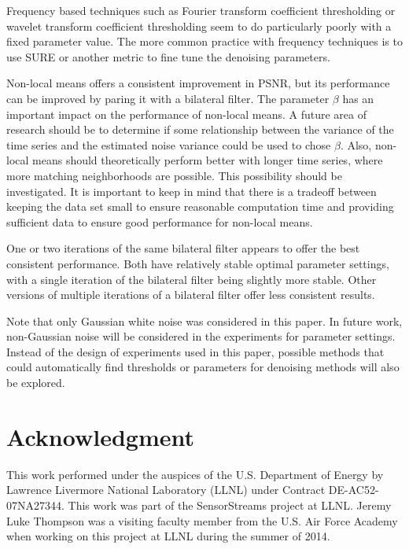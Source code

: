 \documentclass[11pt]{article}
\theoremstyle{definition}
\begin{document}
Frequency based techniques such as Fourier transform coefficient
thresholding or wavelet transform coefficient thresholding seem to do
particularly poorly with a fixed parameter value. The more common
practice with frequency techniques is to use SURE or another metric to
fine tune the denoising parameters.

Non-local means offers a consistent improvement in PSNR, but its
performance can be improved by paring it with a bilateral filter. The
parameter $\beta$ has an important impact on the performance of
non-local means. A future area of research should be to determine if
some relationship between the variance of the time series and the
estimated noise variance could be used to chose $\beta$. Also,
non-local means should theoretically perform better with longer time
series, where more matching neighborhoods are possible. This
possibility should be investigated. It is important to keep in mind
that there is a tradeoff between keeping the data set small to ensure
reasonable computation time and providing sufficient data to ensure
good performance for non-local means.

One or two iterations of the same bilateral filter appears to offer
the best consistent performance. Both have relatively stable optimal
parameter settings, with a single iteration of the bilateral filter
being slightly more stable. Other versions of multiple iterations of a
bilateral filter offer less consistent results.

Note that only Gaussian white noise was considered in this paper. In future work, non-Gaussian noise will be considered in the experiments for parameter settings. Instead of the design of experiments used in this paper, possible methods that could automatically find thresholds or parameters for denoising methods will also be explored.


\section*{Acknowledgment}
This work performed under the auspices of the U.S.  Department of
Energy by Lawrence Livermore National Laboratory (LLNL) under Contract
DE-AC52-07NA27344.  This work was part of the SensorStreams project at
LLNL. Jeremy Luke Thompson was a visiting faculty member from the U.S. Air Force Academy when working on this project at LLNL during the summer of 2014.

\FloatBarrier

%


\end{document}
